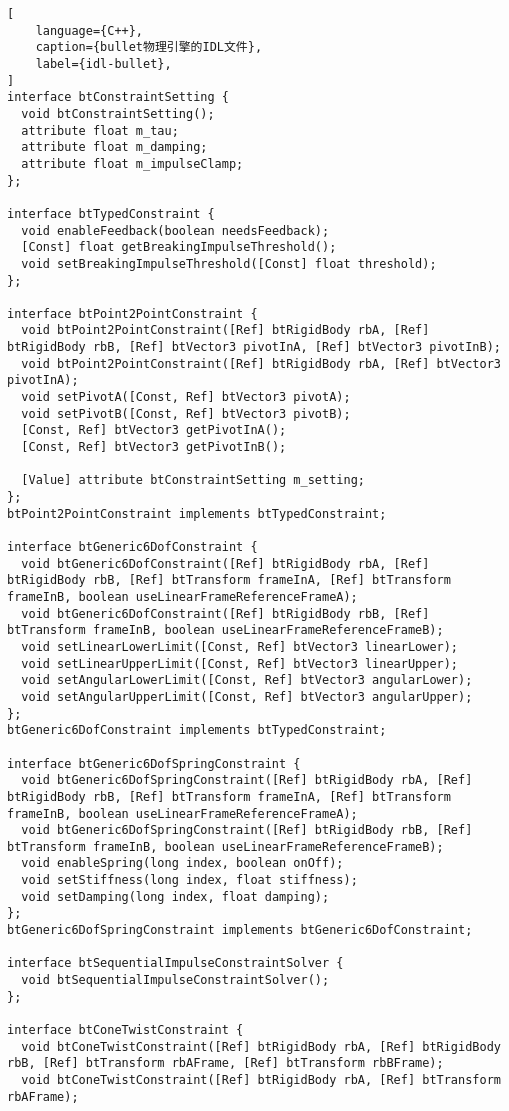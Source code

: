 \begin{lstlisting}[
    language={C++},
    caption={bullet物理引擎的IDL文件},
    label={idl-bullet},
]
interface btConstraintSetting {
  void btConstraintSetting();
  attribute float m_tau;
  attribute float m_damping;
  attribute float m_impulseClamp;
};

interface btTypedConstraint {
  void enableFeedback(boolean needsFeedback);
  [Const] float getBreakingImpulseThreshold();
  void setBreakingImpulseThreshold([Const] float threshold);
};

interface btPoint2PointConstraint {
  void btPoint2PointConstraint([Ref] btRigidBody rbA, [Ref] btRigidBody rbB, [Ref] btVector3 pivotInA, [Ref] btVector3 pivotInB);
  void btPoint2PointConstraint([Ref] btRigidBody rbA, [Ref] btVector3 pivotInA);
  void setPivotA([Const, Ref] btVector3 pivotA);
  void setPivotB([Const, Ref] btVector3 pivotB);
  [Const, Ref] btVector3 getPivotInA();
  [Const, Ref] btVector3 getPivotInB();

  [Value] attribute btConstraintSetting m_setting;
};
btPoint2PointConstraint implements btTypedConstraint;

interface btGeneric6DofConstraint {
  void btGeneric6DofConstraint([Ref] btRigidBody rbA, [Ref] btRigidBody rbB, [Ref] btTransform frameInA, [Ref] btTransform frameInB, boolean useLinearFrameReferenceFrameA);
  void btGeneric6DofConstraint([Ref] btRigidBody rbB, [Ref] btTransform frameInB, boolean useLinearFrameReferenceFrameB);
  void setLinearLowerLimit([Const, Ref] btVector3 linearLower);
  void setLinearUpperLimit([Const, Ref] btVector3 linearUpper);
  void setAngularLowerLimit([Const, Ref] btVector3 angularLower);
  void setAngularUpperLimit([Const, Ref] btVector3 angularUpper);
};
btGeneric6DofConstraint implements btTypedConstraint;

interface btGeneric6DofSpringConstraint {
  void btGeneric6DofSpringConstraint([Ref] btRigidBody rbA, [Ref] btRigidBody rbB, [Ref] btTransform frameInA, [Ref] btTransform frameInB, boolean useLinearFrameReferenceFrameA);
  void btGeneric6DofSpringConstraint([Ref] btRigidBody rbB, [Ref] btTransform frameInB, boolean useLinearFrameReferenceFrameB);
  void enableSpring(long index, boolean onOff);
  void setStiffness(long index, float stiffness);
  void setDamping(long index, float damping);
};
btGeneric6DofSpringConstraint implements btGeneric6DofConstraint;

interface btSequentialImpulseConstraintSolver {
  void btSequentialImpulseConstraintSolver();
};

interface btConeTwistConstraint {
  void btConeTwistConstraint([Ref] btRigidBody rbA, [Ref] btRigidBody rbB, [Ref] btTransform rbAFrame, [Ref] btTransform rbBFrame);
  void btConeTwistConstraint([Ref] btRigidBody rbA, [Ref] btTransform rbAFrame);


\end{lstlisting}
